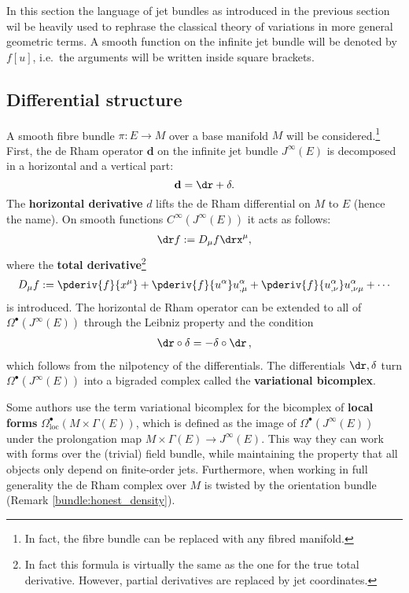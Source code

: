     In this section the language of jet bundles as introduced in the previous section wil be heavily used to rephrase the classical theory of variations in more general geometric terms. A smooth function on the infinite jet bundle will be denoted by $f[u]$, i.e.~the arguments will be written inside square brackets.

\subsection{Differential structure}

    A smooth fibre bundle $\pi:E\rightarrow M$ over a base manifold $M$ will be considered.\footnote{In fact, the fibre bundle can be replaced with any fibred manifold.} First, the de Rham operator $\mathbf{d}$ on the infinite jet bundle $J^\infty(E)$ is decomposed in a horizontal and a vertical part: \[\mathbf{d} = \dr+\delta.\] The \textbf{horizontal derivative} $d$ lifts the de Rham differential on $M$ to $E$ (hence the name). On smooth functions $C^\infty(J^\infty(E))$ it acts as follows:
    \begin{gather}
        \dr f := D_\mu f\drx^\mu,
    \end{gather}
    where the \textbf{total derivative}\footnote{In fact this formula is virtually the same as the one for the true total derivative. However, partial derivatives are replaced by jet coordinates.}
    \begin{gather}
        D_\mu f := \pderiv{f}{x^\mu} + \pderiv{f}{u^\alpha}u^\alpha_{,\mu} + \pderiv{f}{u^\alpha_{,\nu}}u^\alpha_{,\nu\mu} + \cdots
    \end{gather}
    is introduced. The horizontal de Rham operator can be extended to all of $\Omega^\bullet(J^\infty(E))$ through the Leibniz property and the condition
    \begin{gather}
        \dr\circ\delta = -\delta\circ\dr\,,
    \end{gather}
    which follows from the nilpotency of the differentials. The differentials $\dr,\delta$ turn $\Omega^\bullet(J^\infty(E))$ into a bigraded complex called the \textbf{variational bicomplex}.
    \begin{remark}
        Some authors use the term variational bicomplex for the bicomplex of \textbf{local forms} $\Omega^\bullet_\mathrm{loc}(M\times\Gamma(E))$, which is defined as the image of $\Omega^\bullet(J^\infty(E))$ under the prolongation map $M\times\Gamma(E)\rightarrow J^\infty(E)$. This way they can work with forms over the (trivial) field bundle, while maintaining the property that all objects only depend on finite-order jets. Furthermore, when working in full generality the de Rham complex over $M$ is twisted by the orientation bundle (Remark \ref{bundle:honest_density}).
    \end{remark}

